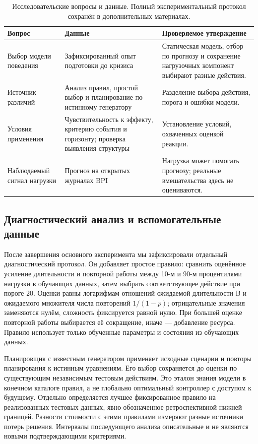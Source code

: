 \begin{table}[t]
\caption{Исследовательские вопросы и данные. Полный экспериментальный протокол сохранён в дополнительных материалах.}\label{tab:questions}
\centering\small\setlength{\tabcolsep}{3pt}\begin{tabular}{p{}p{}p{}}\toprule
Вопрос & Данные & Проверяемое утверждение\\\midrule
Выбор модели поведения & Зафиксированный опыт подготовки до кризиса & Статическая модель, отбор по прогнозу и сохранение нагрузочных компонент выбирают разные действия.\\
Источник различий & Анализ правил, простой выбор и планирование по истинному генератору & Разделение выбора действия, порога и ошибки модели.\\
Условия применения & Чувствительность к эффекту, критерию события и горизонту; проверка выявления структуры & Установление условий, охваченных оценкой реакции.\\
Наблюдаемый сигнал нагрузки & Прогноз на открытых журналах BPI & Нагрузка может помогать прогнозу; реальные вмешательства здесь не оцениваются.\\\bottomrule
\end{tabular}\end{table}

\subsection{Диагностический анализ и вспомогательные данные}
После завершения основного эксперимента мы зафиксировали отдельный диагностический протокол. Он добавляет простое правило: сравнить оценённое усиление длительности и повторной работы между 10-м и 90-м процентилями нагрузки в обучающих данных, затем выбрать соответствующее действие при пороге 20. Оценки равны логарифмам отношений ожидаемой длительности B и ожидаемого множителя числа повторений $1/(1-p)$; отрицательные значения заменяются нулём, сложность фиксируется равной нулю. При большей оценке повторной работы выбирается её сокращение, иначе --- добавление ресурса. Правило использует только обученные параметры и состояния из обучающих данных.

Планировщик с известным генератором применяет исходные сценарии и повторы планирования к истинным уравнениям. Его выбор сохраняется до оценки по существующим независимым тестовым действиям. Это эталон знания модели в конечном каталоге правил, а не глобально оптимальный контроллер с доступом к будущему. Отдельно определяется лучшее фиксированное правило на реализованных тестовых данных, явно обозначенное ретроспективной нижней границей. Разности стоимости с этими правилами измеряют разные источники потерь решения. Интервалы последующего анализа описательные и не являются новыми подтверждающими критериями.

